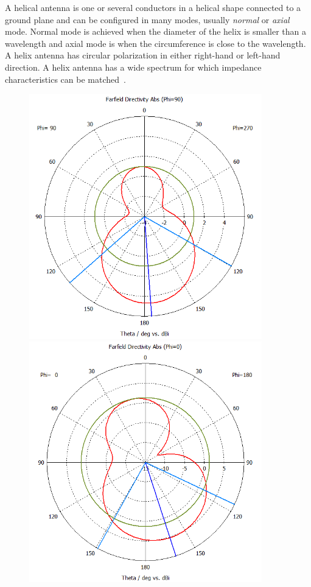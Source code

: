 A helical antenna is one or several conductors in a helical shape connected to a ground plane and can be configured in many modes, usually \textit{normal} or \textit{axial} mode. Normal mode is achieved when the diameter of the helix is smaller than a wavelength and axial mode is when the circumference is close to the wavelength. A helix antenna has circular polarization in either right-hand or left-hand direction. A helix antenna has a wide spectrum for which impedance characteristics can be matched~\cite[p. 12.2]{ant_eng_hk}.
\begin{figure}[H]
    \begin{minipage}{0.45\textwidth}
        \centering
        \includegraphics[width=0.9\textwidth]{figures/farfield (f=2.4) helical.png} %
    \end{minipage}\hfill
    \begin{minipage}{0.45\textwidth}
        \centering
        \includegraphics[width=0.9\textwidth]{figures/farfield (f=2.4) helical_1.png} %

\end{minipage}
\end{figure}
